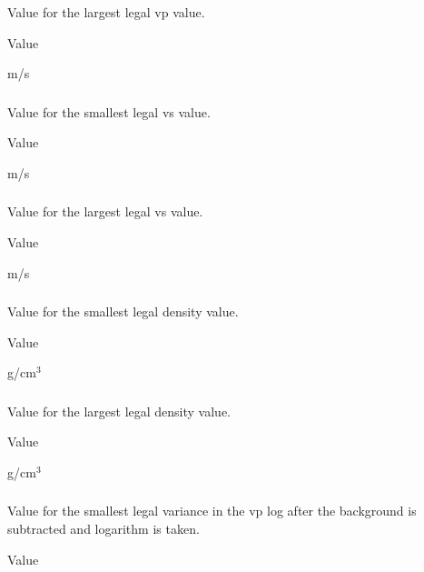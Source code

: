 \subsubsection{}
 \slist
   \item \Description Value for the largest legal vp value.
   \item \Argument Value
   \item {} m/s
 \elist

\subsubsection{}
 \slist
   \item \Description Value for the smallest legal vs value.
   \item \Argument Value
   \item {} m/s
 \elist

\subsubsection{}
 \slist
   \item \Description Value for the largest legal vs value.
   \item \Argument Value
   \item {} m/s
 \elist

\subsubsection{}
 \slist
   \item \Description Value for the smallest legal density value.
   \item \Argument Value
   \item {} g/cm$^3$
\elist

\subsubsection{}
 \slist
   \item \Description Value for the largest legal density value.
   \item \Argument Value
   \item {} g/cm$^3$
 \elist

\subsubsection{}
 \slist
   \item \Description Value for the smallest legal variance in the vp log after the background is subtracted and logarithm is taken.
   \item \Argument Value
   \item {}
 \elist

